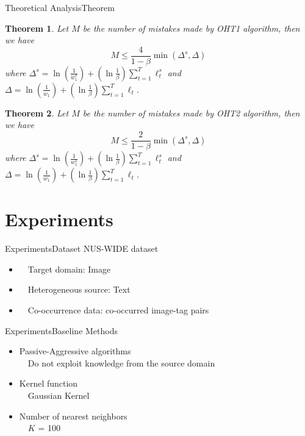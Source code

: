 \documentclass{beamer}
\newtheorem{thm}{Theorem}
\begin{document}
\begin{frame}{Theoretical Analysis}{Theorem}
\begin{thm}
Let $M$ be the number of mistakes made by OHT1 algorithm, then we have 
$$ M \leq \frac{4}{1-\beta} \min (\varDelta^s, \varDelta) $$
where
$ \varDelta^s = \ln(\frac{1}{w_{1}^{s}}) + (\ln \frac{1}{\beta}) \sum\limits_{t=1}^{T} \ell_{t}^{s} $ and $ \varDelta = \ln(\frac{1}{w_{1}}) + (\ln \frac{1}{\beta}) \sum\limits_{t=1}^{T} \ell_{t} $.
\end{thm}
\begin{thm}
Let $M$ be the number of mistakes made by OHT2 algorithm, then we have 
$$ M \leq \frac{2}{1-\beta} \min (\varDelta^s, \varDelta) $$
where
$ \varDelta^s = \ln(\frac{1}{w_{1}^{s}}) + (\ln \frac{1}{\beta}) \sum\limits_{t=1}^{T} \ell_{t}^{s} $ and $ \varDelta = \ln(\frac{1}{w_{1}}) + (\ln \frac{1}{\beta}) \sum\limits_{t=1}^{T} \ell_{t} $.
\end{thm}
\end{frame}

\section{Experiments}
\begin{frame}{Experiments}{Dataset}
NUS-WIDE dataset \\
\begin{itemize}
\item
~~Target domain: Image 
\item
~~Heterogeneous source: Text
\item
~~Co-occurrence data: co-occurred image-tag pairs
\end{itemize}
\end{frame}

\begin{frame}{Experiments}{Baseline Methods}
\begin{itemize}
\item
Passive-Aggressive algorithms \\
~~Do not exploit knowledge from the source domain
\item
Kernel function \\
~~Gaussian Kernel
\item
Number of nearest neighbors \\
~~$K$ = 100
\end{itemize}
\end{frame}
\end{document}

